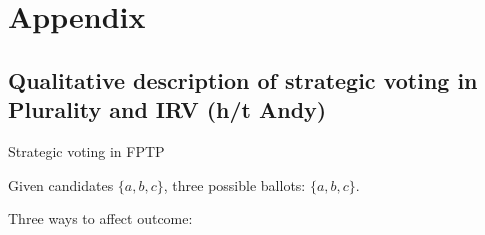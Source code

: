 \documentclass[10pt, en-GB]{beamer}
\begin{document}
\appendix

\section{Appendix}

\subsection{Qualitative description of strategic voting in Plurality and IRV (h/t Andy)}
\label{strat_qual}

\begin{frame}{Strategic voting in FPTP} 

Given candidates $\{a, b, c\}$, three possible ballots: $\{a, b, c\}$.\\ \bigskip \pause 

Three ways to affect outcome: \bigskip %


\end{frame}
\end{document}
